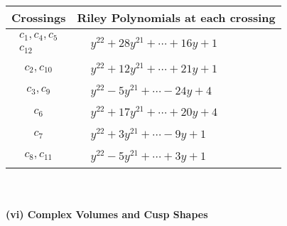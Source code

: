 \documentclass[1p]{elsarticle_modified}
\theoremstyle{definition}
\begin{document}
\begin{tabular}{m{50pt}|m{274pt}}
Crossings & \hspace{64pt}Riley Polynomials at each crossing \\
\hline $$\begin{aligned}c_{1},c_{4},c_{5}\\c_{12}\end{aligned}$$&$\begin{aligned}
&y^{22}+28 y^{21}+\cdots+16 y+1
\end{aligned}$\\
\hline $$\begin{aligned}c_{2},c_{10}\end{aligned}$$&$\begin{aligned}
&y^{22}+12 y^{21}+\cdots+21 y+1
\end{aligned}$\\
\hline $$\begin{aligned}c_{3},c_{9}\end{aligned}$$&$\begin{aligned}
&y^{22}-5 y^{21}+\cdots-24 y+4
\end{aligned}$\\
\hline $$\begin{aligned}c_{6}\end{aligned}$$&$\begin{aligned}
&y^{22}+17 y^{21}+\cdots+20 y+4
\end{aligned}$\\
\hline $$\begin{aligned}c_{7}\end{aligned}$$&$\begin{aligned}
&y^{22}+3 y^{21}+\cdots-9 y+1
\end{aligned}$\\
\hline $$\begin{aligned}c_{8},c_{11}\end{aligned}$$&$\begin{aligned}
&y^{22}-5 y^{21}+\cdots+3 y+1
\end{aligned}$\\
\hline
\end{tabular}\\~\\
\newpage\flushleft \textbf{(vi) Complex Volumes and Cusp Shapes}
\end{document}

